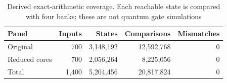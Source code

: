 \begin{table}[t]
\caption{Derived exact-arithmetic coverage. Each reachable state is compared with four banks; these are not quantum gate simulations}\label{tab:coverage}
\centering\small
\begin{tabular}{lrrrr}
\toprule
Panel & Inputs & States & Comparisons & Mismatches\\
\midrule
Original & 700 & 3,148,192 & 12,592,768 & 0\\
Reduced cores & 700 & 2,056,264 & 8,225,056 & 0\\
Total & 1,400 & 5,204,456 & 20,817,824 & 0\\
\bottomrule
\end{tabular}
\end{table}